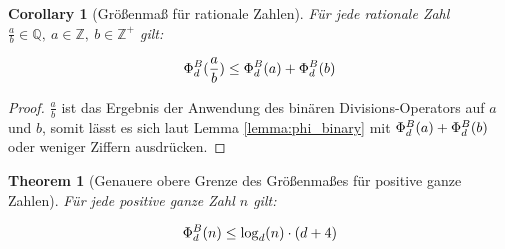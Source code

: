 \documentclass{article}
\newtheorem{theorem}{Theorem}[section]
\newtheorem{corollary}{Corollary}[theorem]
\theoremstyle{nonumberplain}
\newtheorem{proof}{Beweis}
\begin{document}
\begin{corollary}[Größenmaß für rationale Zahlen]\label{corollary:phi_rational}
    Für jede rationale Zahl \(\frac{a}{b}\in\mathbb{Q},\ a\in\mathbb{Z},\ b\in\mathbb{Z}^+\) gilt:

    \[\Phi_{d}^{B}(\frac{a}{b}) \leq \Phi_{d}^{B}(a) + \Phi_{d}^{B}(b)\]
\end{corollary}
\begin{proof}
    \(\frac{a}{b}\) ist das Ergebnis der Anwendung des binären Divisions-Operators auf \(a\) und \(b\), somit lässt es sich laut Lemma \ref{lemma:phi_binary} mit \(\Phi_{d}^{B}(a) + \Phi_{d}^{B}(b)\) oder weniger Ziffern ausdrücken.
\end{proof}
\begin{theorem}[Genauere obere Grenze des Größenmaßes für positive ganze Zahlen]\label{theorem:accurate_bound}
    Für jede positive ganze Zahl \(n\) gilt:
    
        \[\Phi_{d}^{B}(n) \leq \log_d(n) \cdot (d+4)\]
\end{theorem}
\end{document}

